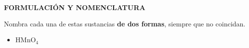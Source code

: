 \documentclass[a4paper,addpoints,14pt]{exam}
\newcommand*\chem[1]{\ensuremath{\mathrm{#1}}}
\newcommand{\halmos}{\vspace*{-4mm}
	
					\begin{flushright}
						\rule{1mm}{2.5mm} 
					\end{flushright}\vspace*{-4mm}
						
					  }
\renewcommand{\qed}{\halmos}
\begin{document}
\begin{questions}
%
%
%
%
%

\vspace*{3ex}



\begin{formulacion}
\textbf{FORMULACIÓN Y NOMENCLATURA}
\end{formulacion}


\begin{question}[2]
	Nombra cada una de estas sustancias \textbf{de dos formas}, siempre que no coincidan. 
	\begin{itemize}
		\item $\chem{HMnO_4}$
		\vspace{50pt}
		
				
		

\end{itemize}
\end{question}
\end{questions}
\end{document}
